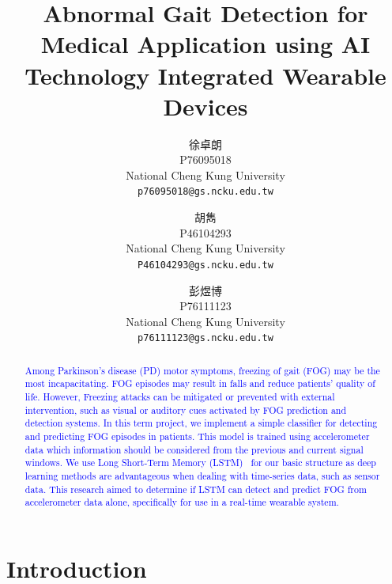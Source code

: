 \documentclass[10pt,twocolumn,letterpaper]{article}
\begin{document}
\title{Abnormal Gait Detection for Medical Application using AI Technology Integrated Wearable Devices}

\author{
    \begin{CJK*}{UTF8}{bkai}
        徐卓朗
    \end{CJK*}
    P76095018\\
    National Cheng Kung University\\
    {\tt\small p76095018@gs.ncku.edu.tw}
    \and
    \begin{CJK*}{UTF8}{bkai}
        胡雋
    \end{CJK*}
    P46104293\\
    National Cheng Kung University\\
    {\tt\small P46104293@gs.ncku.edu.tw}
    \and
    \begin{CJK*}{UTF8}{bkai}
        彭煜博
    \end{CJK*}
    P76111123\\
    National Cheng Kung University\\
    {\tt\small p76111123@gs.ncku.edu.tw}
}
\maketitle

\begin{abstract}
\label{sec:abstract}

\textcolor{blue}{
    Among Parkinson’s disease (PD) motor symptoms, freezing of gait (FOG) may be the most incapacitating. FOG episodes may result in falls and reduce patients’ quality of life. However, Freezing attacks can be mitigated or prevented with external intervention, such as visual or auditory cues activated by FOG prediction and detection systems.
    In this term project, we implement a simple classifier for detecting and predicting FOG episodes in patients. This model is trained using accelerometer data which information should be considered from the previous and current signal windows. We use Long Short-Term Memory (LSTM)~\cite{10.1162/neco.1997.9.8.1735} for our basic structure as deep learning methods are advantageous when dealing with time-series data, such as sensor data.
    This research aimed to determine if LSTM can detect and predict FOG from accelerometer data alone, specifically for use in a real-time wearable system.
}

\end{abstract}

\section{Introduction}
\label{sec:intro}
\end{document}
